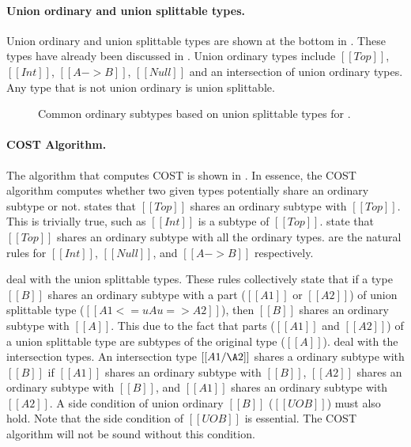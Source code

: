 \paragraph{Union ordinary and union splittable types.}
Union ordinary and union splittable types are shown at the bottom in
. These types have already been discussed
in . Union ordinary types include
$[[Top]]$, $[[Int]]$,
$[[A->B]]$, $[[Null]]$ and an intersection of union
ordinary types. Any type that is not union ordinary is
union splittable.


\begin{figure}[t]
  \begin{small}
    \centering
  \end{small}
  \caption{Common ordinary subtypes based on union splittable types for \name.}
  \label{fig:cost:cost}
\end{figure}


\paragraph{COST Algorithm.}
The algorithm that computes COST is shown in .
In essence, the COST algorithm computes whether two given types
potentially share an ordinary subtype or not.
 states that $[[Top]]$ shares an ordinary
subtype with $[[Top]]$. This is trivially true, such as $[[Int]]$
is a subtype of $[[Top]]$.  state that
$[[Top]]$ shares an ordinary subtype with all the ordinary types.
 are the natural rules for
$[[Int]]$, $[[Null]]$, and $[[A->B]]$ respectively.

 deal with the
union splittable types. These rules collectively state that
if a type $[[B]]$ shares an ordinary subtype with a part ($[[A1]]$ or $[[A2]]$) 
of union splittable type ($[[A1 <=u A u=> A2]]$), then $[[B]]$
shares an ordinary subtype with $[[A]]$. This due to the fact that parts
($[[A1]]$ and $[[A2]]$) of a union splittable type
are subtypes of the original type ($[[A]]$).
deal with the intersection types. An intersection type 
$[[A1/\A2]]$ shares a ordinary subtype with $[[B]]$
if $[[A1]]$ shares an ordinary subtype with $[[B]]$,
$[[A2]]$ shares an ordinary subtype with $[[B]]$, and
$[[A1]]$ shares an ordinary subtype with $[[A2]]$.
A side condition of union ordinary $[[B]]$ ($[[UO B]]$)
must also hold. Note that the side condition of $[[UO B]]$
is essential. The COST algorithm will not be sound without
this condition.

